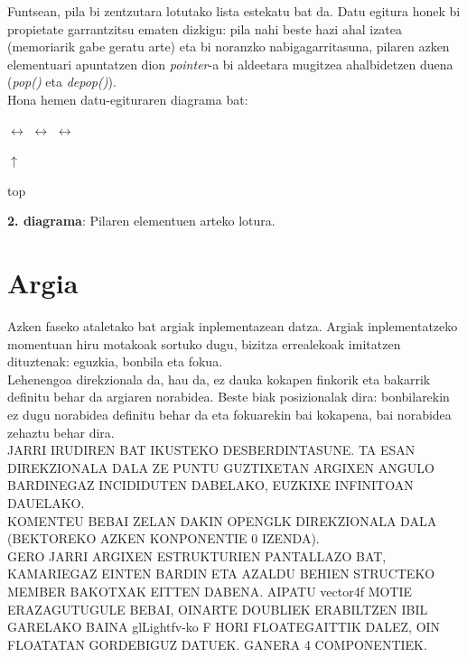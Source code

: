 \documentclass[12pt]{article}
\newcommand{\metodo}[1] {\textit{#1}}
\begin{document}
Funtsean, pila bi zentzutara lotutako lista estekatu bat da. Datu egitura honek bi propietate garrantzitsu ematen dizkigu: pila nahi beste hazi ahal izatea (memoriarik gabe geratu arte) eta bi noranzko nabigagarritasuna, pilaren azken elementuari apuntatzen dion \textit{pointer}-a bi aldeetara mugitzea ahalbidetzen duena (\metodo{pop()} eta \metodo{depop()}).\\
Hona hemen datu-egituraren diagrama bat:

\begin{center}

 $\leftrightarrow$  $\leftrightarrow$  $\leftrightarrow$ 

\hspace{5.5cm} $\uparrow$

\hspace{5.5cm} top

\textbf{2. diagrama}: Pilaren elementuen arteko lotura.
\end{center}

\section{Argia}

Azken faseko ataletako bat argiak inplementazean datza. Argiak inplementatzeko momentuan hiru motakoak sortuko dugu, bizitza errealekoak imitatzen dituztenak: eguzkia, bonbila eta fokua.\\

Lehenengoa direkzionala da, hau da, ez dauka kokapen finkorik eta bakarrik definitu behar da argiaren norabidea. Beste biak posizionalak dira: bonbilarekin ez dugu norabidea definitu behar da eta fokuarekin bai kokapena, bai norabidea zehaztu behar dira.\\

JARRI IRUDIREN BAT IKUSTEKO DESBERDINTASUNE. TA ESAN DIREKZIONALA DALA ZE PUNTU GUZTIXETAN ARGIXEN ANGULO BARDINEGAZ INCIDIDUTEN DABELAKO, EUZKIXE INFINITOAN DAUELAKO.\\

KOMENTEU BEBAI ZELAN DAKIN OPENGLK DIREKZIONALA DALA (BEKTOREKO AZKEN KONPONENTIE 0 IZENDA).\\

GERO JARRI ARGIXEN ESTRUKTURIEN PANTALLAZO BAT, KAMARIEGAZ EINTEN BARDIN ETA AZALDU BEHIEN STRUCTEKO MEMBER BAKOTXAK EITTEN DABENA. AIPATU vector4f MOTIE ERAZAGUTUGULE BEBAI, OINARTE DOUBLIEK ERABILTZEN IBIL GARELAKO BAINA glLightfv-ko F HORI FLOATEGAITTIK DALEZ, OIN FLOATATAN GORDEBIGUZ DATUEK. GANERA 4 COMPONENTIEK.\\
\end{document}
